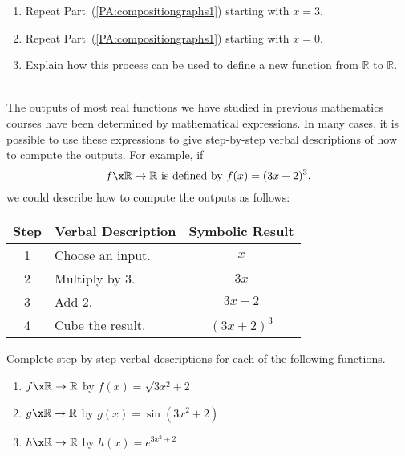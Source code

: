 \begin{previewactivity}
\begin{enumerate}
\item Repeat Part~(\ref{PA:compositiongraphs1}) starting with  $x = 3$.

\item Repeat Part~(\ref{PA:compositiongraphs1}) starting with  $x = 0$.

\item Explain how this process can be used to define a new function from  $\mathbb{R}$
to   $\mathbb{R}$.
\end{enumerate}

\end{previewactivity}
\hbreak
%
\begin{previewactivity} \label{PA:verbaldescriptions} \hfill \\
The outputs of most real functions we have studied in previous mathematics courses have been determined by mathematical expressions.  In many cases, it is possible to use these expressions to give step-by-step verbal descriptions of how to compute the outputs.  For example, if
\[
f\x \mathbb{R} \to \mathbb{R}\text{  is defined by  }f( x ) = ( {3x + 2} )^3, 
\]
we could describe how to compute the outputs as follows:

\begin{center}
\begin{tabular}{| c | l | c|}
\hline
Step  &  \textbf{Verbal Description}  &  \textbf{Symbolic Result}  \\ \hline
1  &  Choose an input.	  &  $x$           \\  \hline
2  &  Multiply by 3.	  &  $3x$          \\  \hline
3  &  Add 2.	        &  $3x + 2$      \\  \hline
4  &  Cube the result.    &  $( {3x + 2} )^3 $  \\  \hline
\end{tabular}
\end{center}
Complete step-by-step verbal descriptions for each of the following functions.
\begin{enumerate}
\item $f\x \mathbb{R} \to \mathbb{R}$ by	$f( x ) = \sqrt {3x^2  + 2} $

\item $g\x \mathbb{R} \to \mathbb{R}$ by $g( x ) = \sin \! \left( {3x^2  + 2} \right)$

\item $h\x \mathbb{R} \to \mathbb{R}$ by	$h( x ) = e^{3x^2  + 2} $

%
\end{enumerate}
\end{previewactivity}
\hbreak

